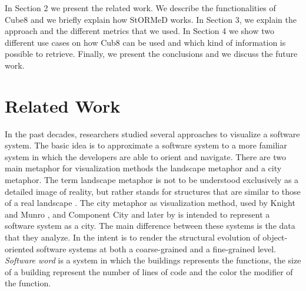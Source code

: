 \documentclass[]{usiinfbachelorproject}
\newcommand {\stormed}[0]{StORMeD\xspace}
\begin{document}
In Section 2 we present the related work. We describe the functionalities of Cube8 and we briefly explain how \stormed works. In Section 3, we explain the approach and the different metrics that we used. In Section 4 we show two different use cases on how Cub8 can be used and which kind of information is possible to retrieve. Finally, we present the conclusions and we discuss the future work.


\newpage


  
\section{Related Work} \label{related works}

In the past decades, researchers studied several  approaches to visualize a software system.
The basic idea is to approximate a software system to a more familiar system in which the developers are able to orient and navigate. 
There are two main metaphor for visualization methods the landscape metaphor and a city metaphor. The term landscape metaphor is not to be understood exclusively as a detailed image of reality, but rather stands for structures that are similar to those of a real landscape \cite{LS}.
The city metaphor as visualization method, used by Knight and Munro \cite{SoftwareWorld}, and Component City \cite{IDM} and later by \cite{vssac,programComp} is intended  to represent a software system as a city. The main difference between these systems is the data that they analyze.
In \cite{Evolution}  the intent is to render the structural evolution of object-oriented software systems at both a coarse-grained and a fine-grained level.
\textit{Software word} \cite{SoftwareWorld} is a system in which the buildings represents the functions, the size of a building represent the number of lines of code and the color the modifier of the function.
\end{document}
